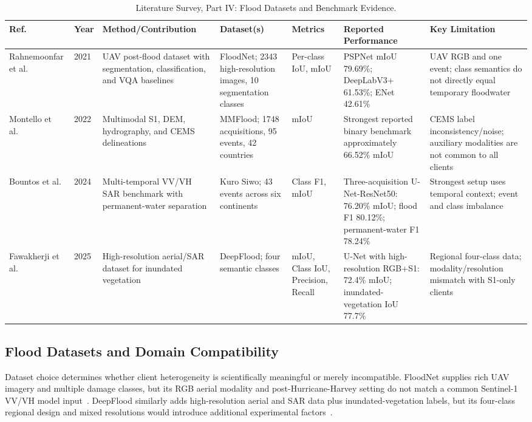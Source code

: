 \documentclass[conference]{IEEEtran}
\begin{document}
\begin{table}[t]
\centering
\caption{Literature Survey, Part IV: Flood Datasets and Benchmark Evidence.}
\label{tab:lit_data}
\small
\begin{tabularx}{\textwidth}{p{1.8cm}p{0.8cm}p{3.2cm}p{2.8cm}p{2.2cm}p{3.2cm}X}
\toprule
\textbf{Ref.} & \textbf{Year} & \textbf{Method/Contribution} & \textbf{Dataset(s)} & \textbf{Metrics} & \textbf{Reported Performance} & \textbf{Key Limitation} \\
\midrule
Rahnemoonfar et al.~\cite{rahnemoonfar2021floodnet} & 2021 & UAV post-flood dataset with segmentation, classification, and VQA baselines & FloodNet; 2343 high-resolution images, 10 segmentation classes & Per-class IoU, mIoU & PSPNet mIoU 79.69\%; DeepLabV3+ 61.53\%; ENet 42.61\% & UAV RGB and one event; class semantics do not directly equal temporary floodwater \\
Montello et al.~\cite{montello2022mmflood} & 2022 & Multimodal S1, DEM, hydrography, and CEMS delineations & MMFlood; 1748 acquisitions, 95 events, 42 countries & mIoU & Strongest reported binary benchmark approximately 66.52\% mIoU & CEMS label inconsistency/noise; auxiliary modalities are not common to all clients \\
Bountos et al.~\cite{bountos2024kuro} & 2024 & Multi-temporal VV/VH SAR benchmark with permanent-water separation & Kuro Siwo; 43 events across six continents & Class F1, mIoU & Three-acquisition U-Net-ResNet50: 76.20\% mIoU; flood F1 80.12\%; permanent-water F1 78.24\% & Strongest setup uses temporal context; event and class imbalance \\
Fawakherji et al.~\cite{fawakherji2025deepflood} & 2025 & High-resolution aerial/SAR dataset for inundated vegetation & DeepFlood; four semantic classes & mIoU, Class IoU, Precision, Recall & U-Net with high-resolution RGB+S1: 72.4\% mIoU; inundated-vegetation IoU 77.7\% & Regional four-class data; modality/resolution mismatch with S1-only clients \\
\bottomrule
\end{tabularx}
\end{table}

\subsection{Flood Datasets and Domain Compatibility}
Dataset choice determines whether client heterogeneity is scientifically meaningful or merely incompatible. FloodNet supplies rich UAV imagery and multiple damage classes, but its RGB aerial modality and post-Hurricane-Harvey setting do not match a common Sentinel-1 VV/VH model input~\cite{rahnemoonfar2021floodnet}. DeepFlood similarly adds high-resolution aerial and SAR data plus inundated-vegetation labels, but its four-class regional design and mixed resolutions would introduce additional experimental factors~\cite{fawakherji2025deepflood}.
\end{document}
